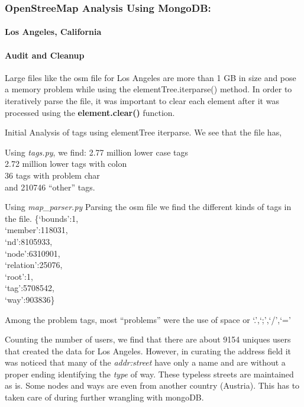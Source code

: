 \documentclass[12pt]{article}
\date{}
\begin{document}
\subsubsection{OpenStreeMap Analysis Using
MongoDB:}\label{openstreemap-analysis-using-mongodb}

\paragraph{Los Angeles, California}\label{los-angeles-california}

\paragraph{Audit and Cleanup}\label{audit-and-cleanup}

Large files like the osm file for Los Angeles are more than 1 GB in size
and pose a memory problem while using the elementTree.iterparse()
method. In order to iteratively parse the file, it was important to
clear each element after it was processed using the
\textbf{element.clear()} function.

Initial Analysis of tags using elementTree iterparse. We see that the
file has,

Using \emph{tags.py}, we find: 2.77 million lower case tags\\2.72
million lower tags with colon\\36 tags with problem char\\and 210746
``other'' tags.

Using \emph{map\_parser.py} Parsing the osm file we find the different
kinds of tags in the file.
\{`bounds':1,\\`member':118031,\\`nd':8105933,\\`node':6310901,\\`relation':25076,\\`root':1,\\`tag':5708542,\\`way':903836\}

Among the problem tags, most ``problems'' were the use of space or
`.',`;',`/',`='

Counting the number of users, we find that there are about 9154 uniques
users that created the data for Los Angeles. However, in curating the
address field it was noticed that many of the \emph{addr:street} have
only a name and are without a proper ending identifying the \emph{type}
of way. These typeless streets are maintained as is. Some nodes and ways
are even from another country (Austria). This has to taken care of
during further wrangling with mongoDB.
\end{document}
